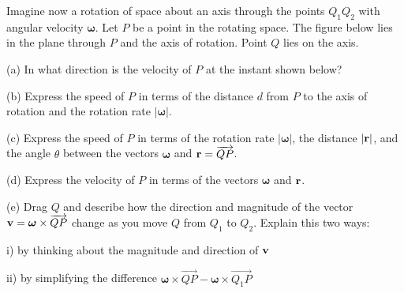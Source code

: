\documentclass{ximera}
\begin{document}
\begin{question}  \label{Qdstjigvgf:Cross}
Imagine now a rotation of space about an axis through the points $Q_1Q_2$ with angular velocity $\boldsymbol{\omega}$. Let $P$ be a point in the rotating space. The figure below lies in the plane through $P$ and the axis of rotation. Point $Q$ lies on the axis.

(a) In what direction is the velocity of $P$ at the instant shown below?

(b) Express the speed of $P$ in terms of the distance $d$ from $P$ to the axis of rotation and the rotation rate $|\boldsymbol{\omega}|$.

(c) Express the speed of $P$ in terms of the rotation rate $|\boldsymbol{\omega}|$, the distance $|{\bf r}|$, and the angle $\theta$ between the vectors $\boldsymbol{\omega}$ and ${\bf r} = \overrightarrow{QP}$.

(d) Express the velocity of $P$ in terms of the vectors $\boldsymbol{\omega}$ and ${\bf r}$.


(e) Drag $Q$ and describe how the direction and magnitude of the vector ${\bf v} = \boldsymbol{\omega}\times {\overrightarrow{QP}}$ change as you move $Q$ from $Q_1$ to $Q_2$. Explain this two ways:

i) by thinking about the magnitude and direction of ${\bf v}$

ii) by simplifying the difference $\boldsymbol{\omega}\times {\overrightarrow{QP}} - \boldsymbol{\omega}\times {\overrightarrow{Q_1P}}$


 
\begin{onlineOnly}
    \begin{center}
\end{center}
\end{onlineOnly}

\end{question}
\end{document}
